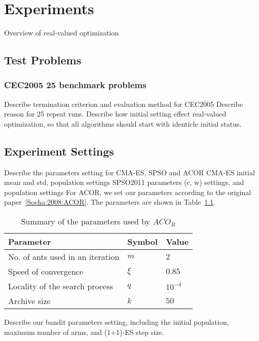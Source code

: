 \chapter{Experiments}
\label{c:experiments}

Overview of real-valued optimization

\section{Test Problems}

\subsection{CEC2005 25 benchmark problems}
Describe termination criterion and evaluation method for CEC2005
Describe reason for 25 repeat runs.
Describe how initial setting effect real-valued optimization, so that all algorithms should start with identicle initial status.


\section{Experiment Settings}

Describe the parameters setting for CMA-ES, SPSO and ACOR
CMA-ES initial mean and std, population settings
SPSO2011 parameters (c, w) settings, and population settings
For ACOR, we set our parameters according to the original paper~\ref{Socha:2008:ACOR}. 
The parameters are shown in Table~\ref{table:ACOR_parameters}.


\begin{table}%
\centering
\label{table:ACOR_parameters}
\begin{tabular}{lll}
\hline
Parameter                        & Symbol   & Value          \\ \hline
No. of ants used in an iteration & $m$      & $2$            \\
Speed of convergence             & $\xi$    & $0.85$         \\
Locality of the search process   & $q$      & $10^{-4}$      \\
Archive size                     & $k$      & $50$           \\ \hline
\end{tabular}
\caption{Summary of the parameters used by $ACO_R$}
\end{table}


Describe our bandit parameters setting, including the initial population, maximum number of arms, and (1+1)-ES step size.
